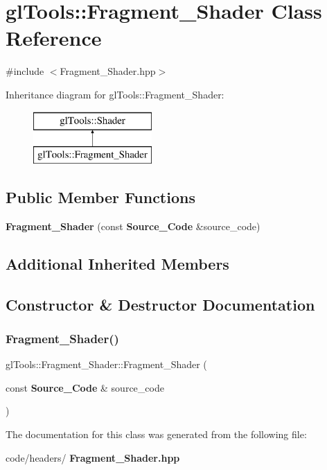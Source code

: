 \section{gl\+Tools\+::Fragment\+\_\+\+Shader Class Reference}
\label{classgl_tools_1_1_fragment___shader}


{\ttfamily \#include $<$Fragment\+\_\+\+Shader.\+hpp$>$}

Inheritance diagram for gl\+Tools\+::Fragment\+\_\+\+Shader\+:\begin{figure}[H]
\begin{center}
\leavevmode
\includegraphics[height=2.000000cm]{classgl_tools_1_1_fragment___shader}
\end{center}
\end{figure}
\subsection*{Public Member Functions}
\begin{DoxyCompactItemize}
\item 
\textbf{ Fragment\+\_\+\+Shader} (const \textbf{ Source\+\_\+\+Code} \&source\+\_\+code)
\end{DoxyCompactItemize}
\subsection*{Additional Inherited Members}


\subsection{Constructor \& Destructor Documentation}
\mbox{\label{classgl_tools_1_1_fragment___shader_a3a40ba76a45f53da8ed8632693e29928}} 
\subsubsection{Fragment\_Shader()}
{\footnotesize\ttfamily gl\+Tools\+::\+Fragment\+\_\+\+Shader\+::\+Fragment\+\_\+\+Shader (\begin{DoxyParamCaption}\item[{const \textbf{ Source\+\_\+\+Code} \&}]{source\+\_\+code }\end{DoxyParamCaption})\hspace{0.3cm}{\ttfamily [inline]}}



The documentation for this class was generated from the following file\+:\begin{DoxyCompactItemize}
\item 
code/headers/\textbf{ Fragment\+\_\+\+Shader.\+hpp}\end{DoxyCompactItemize}
